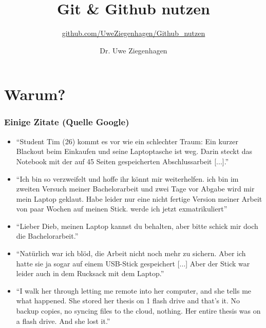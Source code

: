 \documentclass[12pt,ngerman]{beamer}
\title{Git \& Github nutzen}
\author{Dr. Uwe Ziegenhagen}
\subtitle{\url{github.com/UweZiegenhagen/Github_nutzen}}
\begin{document}
\begin{frame}

\maketitle

\end{frame}

\begin{frame}

\tableofcontents

\end{frame}

\section{Warum?}

\begin{frame}[allowframebreaks]
\frametitle{Einige Zitate (Quelle Google)}

\begin{itemize}
	\item \enquote{Student Tim (26) kommt es vor wie ein schlechter
Traum: Ein kurzer Blackout beim Einkaufen und seine
Laptoptasche ist weg. Darin steckt das Notebook mit der
auf 45 Seiten gespeicherten Abschlussarbeit [...].}
	\item \enquote{Ich bin so verzweifelt und hoffe ihr könnt mir
weiterhelfen. ich bin im zweiten Versuch meiner
Bachelorarbeit und zwei Tage vor Abgabe wird mir mein
Laptop geklaut. Habe leider nur eine nicht fertige Version
meiner Arbeit von paar Wochen auf meinen Stick. werde
ich jetzt exmatrikuliert}
	\item \enquote{Lieber Dieb, meinen Laptop kannst du behalten, aber
bitte schick mir doch die Bachelorarbeit.}

\item \enquote{Natürlich war ich blöd, die Arbeit nicht noch mehr zu
sichern. Aber ich hatte sie ja sogar auf einem USB-Stick
gespeichert [...] Aber der Stick war leider auch in dem
Rucksack mit dem Laptop.}
\item  \enquote{I walk her through letting me remote into her computer,
and she tells me what happened. She stored her thesis on
1 flash drive and that’s it. No backup copies, no syncing
files to the cloud, nothing. Her entire thesis was on a
flash drive. And she lost it.}
\end{itemize}

\end{frame}
\end{document}

